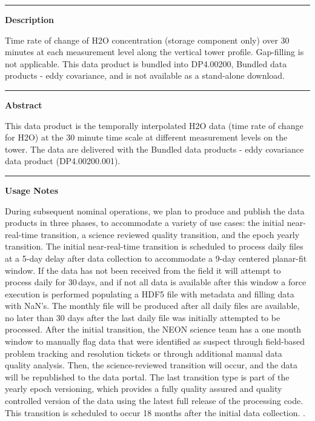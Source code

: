 \documentclass[]{article}
\begin{document}
\begin{center}\rule{0.5\linewidth}{\linethickness}\end{center}

\textbf{Description}

Time rate of change of H2O concentration (storage component only) over
30 minutes at each measurement level along the vertical tower profile.
Gap-filling is not applicable. This data product is bundled into
DP4.00200, Bundled data products - eddy covariance, and is not available
as a stand-alone download.

\begin{center}\rule{0.5\linewidth}{\linethickness}\end{center}

\textbf{Abstract}

This data product is the temporally interpolated H2O data (time rate of
change for H2O) at the 30 minute time scale at different measurement
levels on the tower. The data are delivered with the Bundled data
products - eddy covariance data product (DP4.00200.001).

\begin{center}\rule{0.5\linewidth}{\linethickness}\end{center}

\textbf{Usage Notes}

During subsequent nominal operations, we plan to produce and publish the
data products in three phases, to accommodate a variety of use cases:
the initial near-real-time transition, a science reviewed quality
transition, and the epoch yearly transition. The initial near-real-time
transition is scheduled to process daily files at a 5-day delay after
data collection to accommodate a 9-day centered planar-fit window. If
the data has not been received from the field it will attempt to process
daily for 30\,days, and if not all data is available after this window a
force execution is performed populating a HDF5 file with metadata and
filling data with NaN's. The monthly file will be produced after all
daily files are available, no later than 30 days after the last daily
file was initially attempted to be processed. After the initial
transition, the NEON science team has a one month window to manually
flag data that were identified as suspect through field-based problem
tracking and resolution tickets or through additional manual data
quality analysis. Then, the science-reviewed transition will occur, and
the data will be republished to the data portal. The last transition
type is part of the yearly epoch versioning, which provides a fully
quality assured and quality controlled version of the data using the
latest full release of the processing code. This transition is scheduled
to occur 18 months after the initial data collection. \newpage
.
\end{document}
